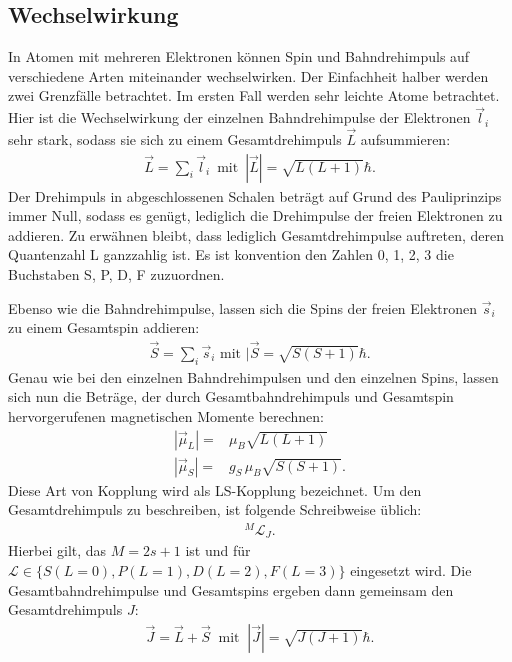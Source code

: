 \subsection{Wechselwirkung}
\noindent In Atomen mit mehreren Elektronen können Spin und Bahndrehimpuls auf
verschiedene Arten miteinander wechselwirken.
Der Einfachheit halber werden zwei Grenzfälle betrachtet.
Im ersten Fall werden sehr leichte Atome betrachtet. Hier ist die Wechselwirkung
der einzelnen Bahndrehimpulse der Elektronen $\vec{l}_i$ sehr stark, sodass sie sich zu
einem Gesamtdrehimpuls $\vec{L}$ aufsummieren:
\FloatBarrier
\begin{align*}
    \vec{L} = \sum_i \vec{l}_i\, \text{ mit }\, |\vec{L}|=\sqrt{L(L+1)}\hbar.
\end{align*}
Der Drehimpuls in abgeschlossenen Schalen beträgt auf Grund des
Pauliprinzips immer Null, sodass es genügt, lediglich die Drehimpulse der freien
Elektronen zu addieren.
Zu erwähnen bleibt, dass lediglich Gesamtdrehimpulse auftreten, deren Quantenzahl L
ganzzahlig ist. Es ist konvention den Zahlen 0, 1, 2, 3 die Buchstaben S, P, D, F zuzuordnen.

\noindent Ebenso wie die Bahndrehimpulse, lassen sich die Spins der freien Elektronen $\vec{s}_i$
zu einem Gesamtspin addieren:
\begin{align*}
    \vec{S} = \sum_i \vec{s}_i \text{ mit } |\vec{S}=\sqrt{S(S+1)}\hbar.
\end{align*}
Genau wie bei den einzelnen Bahndrehimpulsen und den einzelnen Spins, lassen sich
nun die Beträge, der durch Gesamtbahndrehimpuls und Gesamtspin hervorgerufenen magnetischen
Momente berechnen:
\begin{align*}
    |\vec{\mu}_L| =& \mu_B\sqrt{L(L+1)} \\
    |\vec{\mu}_S| =& g_S \, \mu_B\sqrt{S(S+1)}.
\end{align*}
Diese Art von Kopplung wird als LS-Kopplung bezeichnet.
Um den Gesamtdrehimpuls zu beschreiben, ist folgende Schreibweise üblich:
\begin{align*}
    {}^M\mathcal{L}_J.
\end{align*}
Hierbei gilt, das $M=2s+1$ ist und für $\mathcal{L}\in\{S(L=0), P(L=1), D(L=2), F(L=3)\}$
eingesetzt wird.
Die Gesamtbahndrehimpulse und Gesamtspins ergeben dann gemeinsam den Gesamtdrehimpuls $J$:
\begin{align*}
    \vec{J}=\vec{L}+\vec{S} \ \text{ mit }\ |\vec{J}|=\sqrt{J(J+1)}\hbar.
\end{align*}

